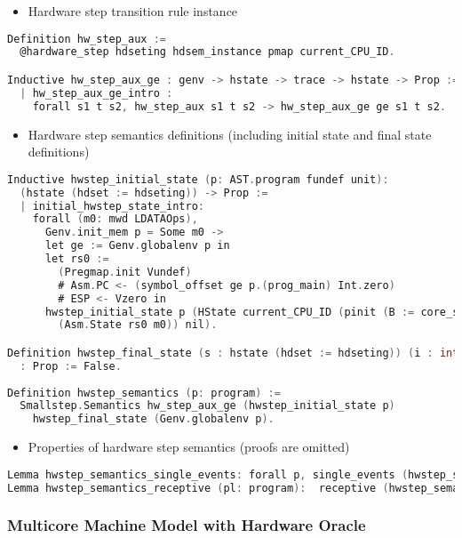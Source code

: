 \begin{itemize}[leftmargin=*]
\item Hardware step transition rule instance
\end{itemize}
\begin{lstlisting}[language=C]
Definition hw_step_aux :=
  @hardware_step hdseting hdsem_instance pmap current_CPU_ID.

Inductive hw_step_aux_ge : genv -> hstate -> trace -> hstate -> Prop :=
  | hw_step_aux_ge_intro : 
    forall s1 t s2, hw_step_aux s1 t s2 -> hw_step_aux_ge ge s1 t s2.
\end{lstlisting}

\begin{itemize}[leftmargin=*]
\item Hardware step semantics definitions (including initial state and final state definitions)
\end{itemize}
\begin{lstlisting}[language=C]    
Inductive hwstep_initial_state (p: AST.program fundef unit): 
  (hstate (hdset := hdseting)) -> Prop := 
  | initial_hwstep_state_intro: 
    forall (m0: mwd LDATAOps),
      Genv.init_mem p = Some m0 ->
      let ge := Genv.globalenv p in
      let rs0 :=
        (Pregmap.init Vundef)
        # Asm.PC <- (symbol_offset ge p.(prog_main) Int.zero)
        # ESP <- Vzero in
      hwstep_initial_state p (HState current_CPU_ID (pinit (B := core_set)
        (Asm.State rs0 m0)) nil).

Definition hwstep_final_state (s : hstate (hdset := hdseting)) (i : int) 
  : Prop := False.
      
Definition hwstep_semantics (p: program) :=
  Smallstep.Semantics hw_step_aux_ge (hwstep_initial_state p) 
    hwstep_final_state (Genv.globalenv p).
\end{lstlisting}
    
\begin{itemize}[leftmargin=*]
\item Properties of hardware step semantics (proofs are omitted)
\end{itemize}
\begin{lstlisting}[language=C]    
Lemma hwstep_semantics_single_events: forall p, single_events (hwstep_semantics p).
Lemma hwstep_semantics_receptive (pl: program):  receptive (hwstep_semantics pl).
\end{lstlisting}

\subsubsection{Multicore Machine Model with Hardware Oracle}

